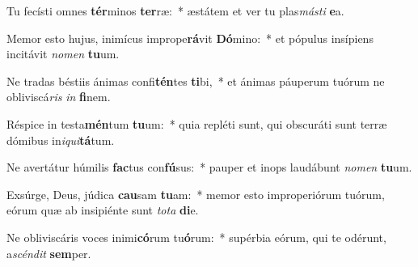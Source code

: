 \item Tu fecísti omnes \textbf{tér}minos \textbf{ter}ræ:~* æstátem et ver tu plas\textit{más}\textit{ti} \textbf{e}a.
\item Memor esto hujus, inimícus imprope\textbf{rá}vit \textbf{Dó}mino:~* et pópulus insípiens incitávit \textit{no}\textit{men} \textbf{tu}um.
\item Ne tradas béstiis ánimas confi\textbf{tén}tes \textbf{ti}bi,~* et ánimas páuperum tuórum ne obliviscá\textit{ris} \textit{in} \textbf{fi}nem.
\item Réspice in testa\textbf{mén}tum \textbf{tu}um:~* quia repléti sunt, qui obscuráti sunt terræ dómibus in\textit{i}\textit{qui}\textbf{tá}tum.
\item Ne avertátur húmilis \textbf{fac}tus con\textbf{fú}sus:~* pauper et inops laudábunt \textit{no}\textit{men} \textbf{tu}um.
\item Exsúrge, Deus, júdica \textbf{cau}sam \textbf{tu}am:~* memor esto improperiórum tuórum, eórum quæ ab insipiénte sunt \textit{to}\textit{ta} \textbf{di}e.
\item Ne obliviscáris voces inimi\textbf{có}rum tu\textbf{ó}rum:~* supérbia eórum, qui te odérunt, a\textit{scén}\textit{dit} \textbf{sem}per.
